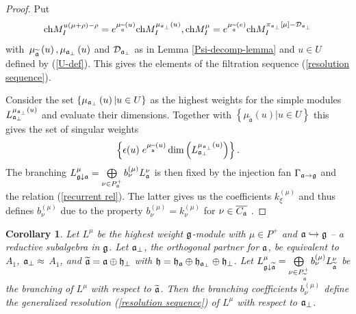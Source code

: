 \documentclass[12pt]{article}
\newtheorem{corollary}{Corollary}[theorem]
\theoremstyle{definition}
\begin{document}
\begin{proof}
Put
\begin{equation*}
\mathrm{ch}M_{I}^{u\left( \mu +\rho \right) -\rho }=e^{\mu _{\widetilde{%
\frak{a}}}\left( u\right) }\mathrm{ch}M_{I}^{\mu _{\frak{a}_{\perp }}\left(
u\right) },\mathrm{ch}M_{I}^{\mu }=e^{\mu _{\widetilde{\frak{a}}}\left(
e\right) }\mathrm{ch}M_{I}^{\pi _{\frak{a}_{\perp }}\left[ \mu \right] -%
\mathcal{D}_{\frak{a}_{\perp }}}
\end{equation*}
with\ $\mu _{\widetilde{\frak{a}}}\left( u\right) ,\mu _{\frak{a}_{\perp
}}\left( u\right) $ and $\mathcal{D}_{\frak{a}_{\perp }}$ as in Lemma \ref{Psi-decomp-lemma} and $%
u\in U$ defined by (\ref{U-def}). This gives the elements of the filtration
sequence (\ref{resolution sequence}).

Consider the set $\left\{ \mu _{\frak{a}_{\perp }}\left( u\right) |u\in
U\right\} $ as the highest weights for the simple modules $L_{\frak{a}%
_{\perp }}^{\mu _{\frak{a}_{\perp }}\left( u\right) }$ and evaluate their
dimensions. Together with
$\left\{ \mu _{\widetilde{\mathfrak{a}}}\left( u\right) |u\in
U\right\} $ this gives the set of singular weights
\begin{equation*}
\left\{ \epsilon (u)\;
e^{\mu _{\widetilde{\mathfrak{a}}}\left( u\right) }
\dim \left( L_{\frak{a}_{\perp }}^{\mu _{\frak{a}_{\perp
}}\left( u\right) }\right) \right\} .
\end{equation*}
The branching $L_{\frak{g}\downarrow \frak{a}}^{\mu }=\bigoplus\limits_{\nu
\in P_{\frak{a}}^{+}}b_{\nu }^{\left( \mu \right) }L_{\frak{a}}^{\nu }$ is
then fixed by the injection fan $\Gamma _{\frak{a}\rightarrow \frak{g}}$ and
the relation (\ref{recurrent rel}). The latter gives us the coefficients $k_{\xi
}^{\left( \mu \right) }$ and thus defines $b_{\nu }^{\left( \mu \right) }$
due to the property $b_{\nu }^{\left( \mu \right) }=k_{\nu }^{\left( \mu
\right) }$ for $\nu \in \overline{C_{\frak{a}}}$ .
\end{proof}

\begin{corollary}

Let $L^{\mu }$ be the highest weight $\frak{g}$-module with $\mu \in P^{+}$
and $\frak{a}\hookrightarrow \frak{g}$ -- a reductive subalgebra in $\frak{g}
$. Let $\frak{a}_{\perp }$, the orthogonal partner for $\frak{a}$, be
equivalent to $A_{1}$, $\frak{a}_{\perp }\approx $ $A_{1}$, and $\widetilde{%
\frak{a}}=\frak{a}\oplus \frak{h}_{\perp }$ with $\frak{h=\frak{h}_{\frak{a}}%
}\oplus \frak{h}_{\frak{a}_{\perp }}\oplus \frak{h}_{\perp }$. Let $L_{%
\frak{g}\downarrow \widetilde{\frak{a}}}^{\mu }=\bigoplus\limits_{\nu \in P_{%
\widetilde{\frak{a}}}^{+}}b_{\nu }^{\left( \mu \right) }L_{\widetilde{\frak{a%
}}}^{\nu }$ be the branching of $L^{\mu }$ with respect to $\widetilde{\frak{%
a}}$. Then the branching coefficients $b_{\nu }^{\left( \mu \right) }$
define the generalized resolution (\ref{resolution sequence}) of $L^{\mu }$
with respect to $\frak{a}_{\perp }$.
\end{corollary}
\end{document}
